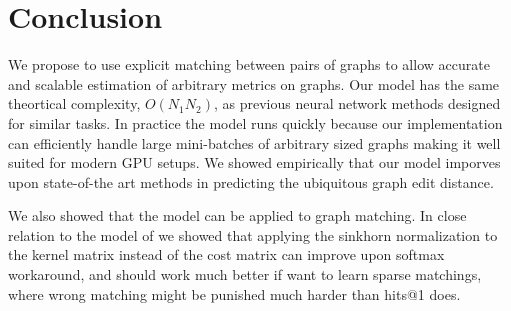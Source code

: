 \section{Conclusion}

We propose to use explicit matching between pairs of graphs to allow accurate and scalable estimation of arbitrary metrics on graphs. Our model has the same theortical complexity, $O(N_1 N_2)$, as previous neural network methods designed for similar tasks. In practice the model runs quickly because our implementation can efficiently handle large mini-batches of arbitrary sized graphs making it well suited for modern GPU setups. We showed empirically that our model imporves upon state-of-the art methods in predicting the ubiquitous graph edit distance.



We also showed that the model can be applied to graph matching. In close relation to the model of \cite{fey2020_update} we showed that applying the sinkhorn normalization to the kernel matrix instead of the cost matrix can improve upon softmax workaround, and should work much better if want to learn sparse matchings, where wrong matching might be punished much harder than hits@1 does. %
